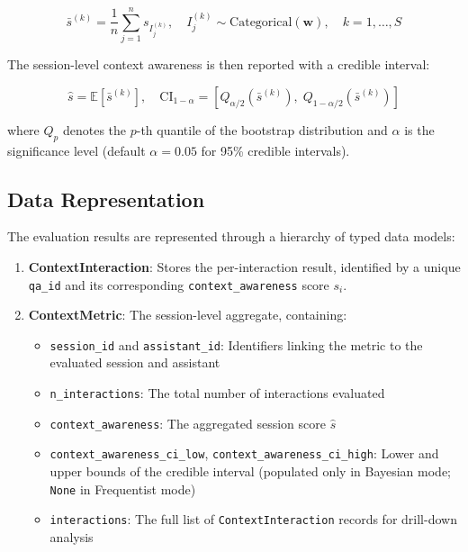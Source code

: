 \documentclass[11pt,a4paper]{article}
\begin{document}
\begin{equation}
    \bar{s}^{(k)} = \frac{1}{n} \sum_{j=1}^{n} s_{I_j^{(k)}}, \quad I_j^{(k)} \sim \text{Categorical}(\mathbf{w}), \quad k = 1, \ldots, S
\end{equation}

The session-level context awareness is then reported with a credible interval:

\begin{equation}
    \hat{s} = \mathbb{E}[\bar{s}^{(k)}], \quad \text{CI}_{1-\alpha} = \left[ Q_{\alpha/2}(\bar{s}^{(k)}), \; Q_{1-\alpha/2}(\bar{s}^{(k)}) \right]
\end{equation}

where $Q_p$ denotes the $p$-th quantile of the bootstrap distribution and $\alpha$ is the significance level (default $\alpha = 0.05$ for 95\% credible intervals).

\subsection{Data Representation}

The evaluation results are represented through a hierarchy of typed data models:

\begin{enumerate}
    \item \textbf{ContextInteraction}: Stores the per-interaction result, identified by a unique \texttt{qa\_id} and its corresponding \texttt{context\_awareness} score $s_i$.
    \item \textbf{ContextMetric}: The session-level aggregate, containing:
    \begin{itemize}
        \item \texttt{session\_id} and \texttt{assistant\_id}: Identifiers linking the metric to the evaluated session and assistant
        \item \texttt{n\_interactions}: The total number of interactions evaluated
        \item \texttt{context\_awareness}: The aggregated session score $\hat{s}$
        \item \texttt{context\_awareness\_ci\_low}, \texttt{context\_awareness\_ci\_high}: Lower and upper bounds of the credible interval (populated only in Bayesian mode; \texttt{None} in Frequentist mode)
        \item \texttt{interactions}: The full list of \texttt{ContextInteraction} records for drill-down analysis
    \end{itemize}
\end{enumerate}
\end{document}
